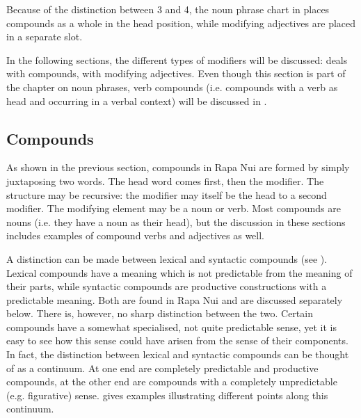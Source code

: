 Because of the distinction between 3 and 4, the noun phrase chart in  places compounds as a whole in the head position, while modifying adjectives are placed in a separate slot.

In the following sections, the different types of modifiers will be discussed:  deals with compounds,  with modifying adjectives. Even though this section is part of the chapter on noun phrases, verb compounds (i.e. compounds with a verb as head and occurring in a verbal context) will be discussed in .

\subsection{Compounds}\label{sec:5.7.2}
As shown in the previous section, compounds in Rapa Nui are formed by simply juxtaposing two words. The head word comes first, then the modifier. The structure may be recursive: the modifier may itself be the head to a second modifier. The modifying element may be a noun or verb. Most compounds are nouns (i.e. they have a noun as their head), but the discussion in these sections includes examples of compound verbs and adjectives as well.

A distinction can be made between lexical and syntactic compounds (see \citealt[175]{Dryer2007Noun}). Lexical compounds have a meaning which is not predictable from the meaning of their parts, while syntactic compounds are productive constructions with a predictable meaning. Both are found in Rapa Nui and are discussed separately below. There is, however, no sharp distinction between the two. Certain compounds have a somewhat specialised, not quite predictable sense, yet it is easy to see how this sense could have arisen from the sense of their components. In fact, the distinction between lexical and syntactic compounds can be thought of as a continuum. At one end are completely predictable and productive compounds, at the other end are compounds with a completely unpredictable (e.g. figurative) sense.  gives examples illustrating different points along this continuum.

